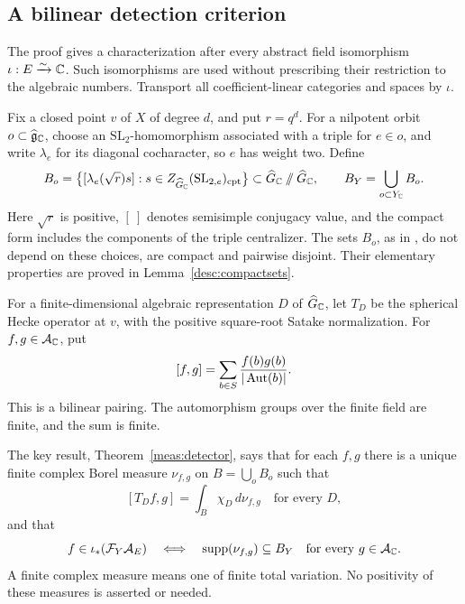\subsection{A bilinear detection criterion}

The proof gives a characterization after every abstract field
isomorphism $\iota:E\xrightarrow{\sim}\mathbb C$. Such isomorphisms are used
without prescribing their restriction to the algebraic numbers.
Transport all coefficient-linear categories and spaces by $\iota$.

Fix a closed point $v$ of $X$ of degree $d$, and put $r=q^d$. For a
nilpotent orbit $o\subset\widehat{\mathfrak g}_\mathbb C$, choose an $\mathrm{SL}_2$-homomorphism
associated with a triple for $e\in o$, and write $\lambda_e$ for its
diagonal cocharacter, so $e$ has weight two. Define
\begin{equation}\label{intro:compactsets}
B_o=\bigl\{[\lambda_e(\sqrt r)s]:
s\in Z_{\widehat G_\mathbb C}(\mathrm{SL}_{2,e})_{\mathrm{cpt}}\bigr\}
\subset\widehat G_\mathbb C\mathbin{/\mkern-6mu/}\widehat G_\mathbb C,
\qquad
B_Y=\bigcup_{o\subset Y_\mathbb C}B_o.
\end{equation}
Here $\sqrt r$ is positive, $[\ ]$ denotes semisimple conjugacy value,
and the compact form includes the components of the triple centralizer.
The sets $B_o$, as in \cite[Sections~3.1.1--3.1.3]{GLR}, do not depend
on these choices, are compact and pairwise disjoint. Their elementary properties are proved in
Lemma~\ref{desc:compactsets}.

For a finite-dimensional algebraic representation $D$ of $\widehat G_\mathbb C$,
let $T_D$ be the spherical Hecke operator at $v$, with the positive
square-root Satake normalization. For $f,g\in\mathcal A_\mathbb C$, put
\begin{equation}\label{intro:pairing}
[f,g]=\sum_{b\in S}\frac{f(b)g(b)}{|\operatorname{Aut}(b)|}.
\end{equation}
This is a bilinear pairing. The automorphism groups over the finite field
are finite, and the sum is finite.

The key result, Theorem~\ref{meas:detector}, says that for each $f,g$
there is a unique finite complex Borel measure $\nu_{f,g}$ on
$B=\bigcup_oB_o$ such that
\begin{equation}\label{intro:moments}
[T_Df,g]=\int_B\chi_D\,d\nu_{f,g}
\quad\text{for every }D,
\end{equation}
and that
\begin{equation}\label{intro:detector}
f\in\iota_*(\mathcal F_Y\mathcal A_E)
\quad\Longleftrightarrow\quad
\operatorname{supp}(\nu_{f,g})\subseteq B_Y
\quad\text{for every }g\in\mathcal A_\mathbb C.
\end{equation}
A finite complex measure means one of finite total variation. No positivity
of these measures is asserted or needed.

